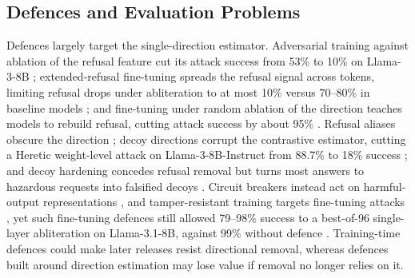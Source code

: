 \subsection{Defences and Evaluation Problems}

Defences largely target the single-direction estimator. Adversarial training
against ablation of the refusal feature cut its attack success from 53\% to
10\% on Llama-3-8B \cite{yu2025refusal}; extended-refusal fine-tuning spreads
the refusal signal across tokens, limiting refusal drops under abliteration to
at most 10\% versus 70--80\% in baseline models \cite{abushairah2025defense};
and fine-tuning under random ablation of the direction teaches models to
rebuild refusal, cutting attack success by about 95\% \cite{xie2025beyond}.
Refusal aliases obscure the direction \cite{truong2026abliteration}; decoy
directions corrupt the contrastive estimator, cutting a Heretic weight-level
attack on Llama-3-8B-Instruct from 88.7\% to 18\% success
\cite{muhamed2026decoy}; and decoy hardening concedes refusal removal but turns
most answers to hazardous requests into falsified decoys
\cite{russinovich2026fools}. Circuit breakers instead act on harmful-output
representations \cite{zou2024circuit}, and tamper-resistant training targets
fine-tuning attacks \cite{tamirisa2025tamper,rosati2024representation}, yet
such fine-tuning defences still allowed 79--98\% success to a best-of-96
single-layer abliteration on Llama-3.1-8B, against 99\% without defence
\cite{kuo2026openweight}. Training-time defences could make later releases
resist directional removal, whereas defences built around direction
estimation may lose value if removal no longer relies on it.

